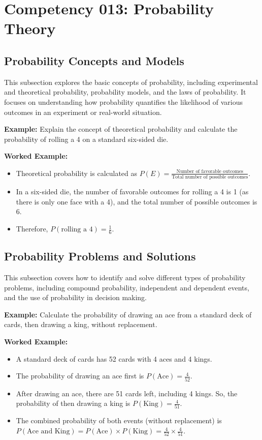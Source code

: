 \documentclass{book}
\begin{document}
\section{Competency 013: Probability Theory}


\subsection{Probability Concepts and Models}
This subsection explores the basic concepts of probability, including experimental and theoretical probability, probability models, and the laws of probability. It focuses on understanding how probability quantifies the likelihood of various outcomes in an experiment or real-world situation.


\textbf{Example:} Explain the concept of theoretical probability and calculate the probability of rolling a 4 on a standard six-sided die.


\textbf{Worked Example:}
\begin{itemize}
        \item Theoretical probability is calculated as \( P(E) = \frac{\text{Number of favorable outcomes}}{\text{Total number of possible outcomes}} \).
        \item In a six-sided die, the number of favorable outcomes for rolling a 4 is 1 (as there is only one face with a 4), and the total number of possible outcomes is 6.
        \item Therefore, \( P(\text{rolling a 4}) = \frac{1}{6} \).
\end{itemize}


\subsection{Probability Problems and Solutions}
This subsection covers how to identify and solve different types of probability problems, including compound probability, independent and dependent events, and the use of probability in decision making.


\textbf{Example:} Calculate the probability of drawing an ace from a standard deck of cards, then drawing a king, without replacement.


\textbf{Worked Example:}
\begin{itemize}
        \item A standard deck of cards has 52 cards with 4 aces and 4 kings.
        \item The probability of drawing an ace first is \( P(\text{Ace}) = \frac{4}{52} \).
        \item After drawing an ace, there are 51 cards left, including 4 kings. So, the probability of then drawing a king is \( P(\text{King}) = \frac{4}{51} \).
        \item The combined probability of both events (without replacement) is \( P(\text{Ace and King}) = P(\text{Ace}) \times P(\text{King}) = \frac{4}{52} \times \frac{4}{51} \).
\end{itemize}
\end{document}
